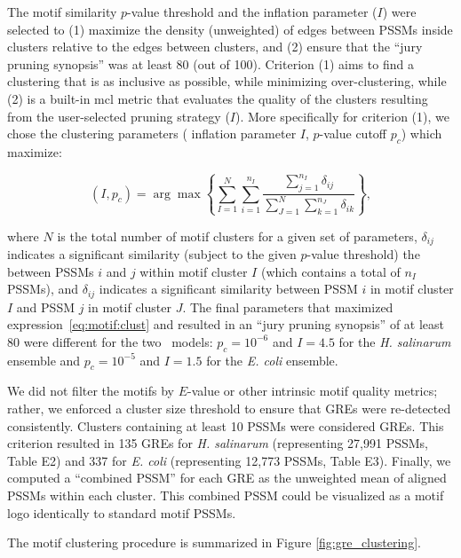 The  motif
similarity $p$-value threshold and the  inflation
parameter ($I$) were selected to (1) maximize the density (unweighted)
of edges between PSSMs inside clusters relative to the edges between
clusters, and (2) ensure that the  ``jury pruning
synopsis'' was at least 80 (out of 100). Criterion (1) aims to
find a clustering that is as inclusive as possible, while minimizing
over-clustering, while (2) is a built-in mcl metric that evaluates the
quality of the clusters resulting from the user-selected pruning
strategy ($I$). More specifically for criterion (1), we chose the
clustering parameters ( inflation parameter
$I$,  $p$-value cutoff $p_c$) which maximize:

\begin{equation}
\label{eq:motif:clust}
\left( I, p_c\right) = \arg \max \left\{ \sum_{I=1}^N \sum_{i=1}^{n_I} \frac{ \sum_{j=1}^{n_I} \delta_{ij} }
                            { \sum_{J=1}^N \sum_{k=1}^{n_J} \delta_{ik} } \right\},
\end{equation}

\noindent where $N$ is the total number of motif clusters for a given set of
parameters, $\delta_{ij}$ indicates a significant similarity (subject
to the given $p$-value threshold) the between PSSMs $i$ and $j$ within
motif cluster $I$ (which contains a total of $n_I$ PSSMs), and
$\delta_{ij}$ indicates a significant similarity between PSSM $i$ in
motif cluster $I$ and PSSM $j$ in motif cluster $J$. The final
parameters that maximized expression~\ref{eq:motif:clust} and
resulted in an  ``jury pruning synopsis'' of at least 80
were different for the two \egrine~models: $p_c = 10^{-6}$
and  $I = 4.5$ for the {\it H. salinarum} ensemble and
$p_c = 10^{-5}$ and  $I = 1.5$ for the {\it E. coli}
ensemble.

We did not filter the motifs by $E$-value or other intrinsic motif
quality metrics; rather, we enforced a cluster size threshold to ensure
that GREs were re-detected consistently. Clusters containing at least
10 PSSMs were considered GREs. This criterion resulted in 
135 GREs for {\it H. salinarum}
(representing 27,991 PSSMs, Table E2) and 337 for {\it E. coli}
(representing 12,773 PSSMs, Table E3). Finally, we computed a
``combined PSSM'' for each GRE as the unweighted mean of aligned PSSMs
within each cluster. This
combined PSSM could be visualized as a motif logo identically to
standard motif PSSMs.

The motif clustering procedure is summarized in Figure \ref{fig:gre_clustering}. 

